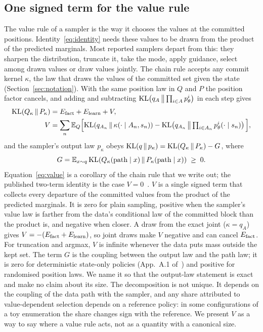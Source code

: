 \subsection{One signed term for the value rule}
\label{sec:budget-value}

The value rule of a sampler is the way it chooses the values at the committed positions. Identity~\eqref{eq:identity} needs these values to be drawn from the product of the predicted marginals. Most reported samplers depart from this: they sharpen the distribution, truncate it, take the mode, apply guidance, select among drawn values or draw values jointly. The chain rule accepts any commit kernel $\kappa$, the law that draws the values of the committed set given the state (Section~\ref{sec:notation}). With the same position law in $Q$ and $P$ the position factor cancels, and adding and subtracting $\mathrm{KL}\!\left(q_{A}\,\middle\|\,\prod_{i\in A}p_\theta^i\right)$ in each step gives
\begin{equation}
  \begin{split}
  \mathrm{KL}\!\left(Q_\kappa\,\middle\|\,P_\kappa\right)&=E_{\mathrm{fact}}+E_{\mathrm{learn}}+V,\\
  V&=\sum_n\mathbb E_Q\Big[\mathrm{KL}\!\left(q_{A_n}\,\middle\|\,\kappa(\cdot\mid A_n,s_n)\right)-\mathrm{KL}\!\left(q_{A_n}\,\middle\|\,\textstyle\prod_{i\in A_n}p_\theta^i(\cdot\mid s_n)\right)\Big],
  \end{split}
  \label{eq:value}
\end{equation}
and the sampler's output law $p_\kappa$ obeys $\mathrm{KL}\!\left(q\,\middle\|\,p_\kappa\right)=\mathrm{KL}\!\left(Q_\kappa\,\middle\|\,P_\kappa\right)-G$, where
\begin{equation*}
  G=\mathbb E_{x\sim q}\,\mathrm{KL}\!\left(Q_\kappa(\text{path}\mid x)\,\middle\|\,P_\kappa(\text{path}\mid x)\right)\;\ge\;0.
\end{equation*}
Equation~\eqref{eq:value} is a corollary of the chain rule that we write out; the published two-term identity is the case $V=0$~\cite{arXiv:2505.24857}. %
$V$ is a single signed term that collects every departure of the committed values from the product of the predicted marginals. It is zero for plain sampling, positive when the sampler's value law is farther from the data's conditional law of the committed block than the product is, and negative when closer. A draw from the exact joint ($\kappa=q_A$) gives $V=-(E_{\mathrm{fact}}+E_{\mathrm{learn}})$, so joint draws make $V$ negative and can cancel $E_{\mathrm{fact}}$. For truncation and argmax, $V$ is infinite whenever the data puts mass outside the kept set. %
The term $G$ is the coupling between the output law and the path law; it is zero for deterministic state-only policies (App.~A.1 of~\cite{arXiv:2505.24857}) and positive for randomised position laws. We name it so that the output-law statement is exact and make no claim about its size.
The decomposition is not unique. It depends on the coupling of the data path with the sampler, and any share attributed to value-dependent selection depends on a reference policy: in some configurations of a toy enumeration the share changes sign with the reference. We present $V$ as a way to say where a value rule acts, not as a quantity with a canonical size. %

